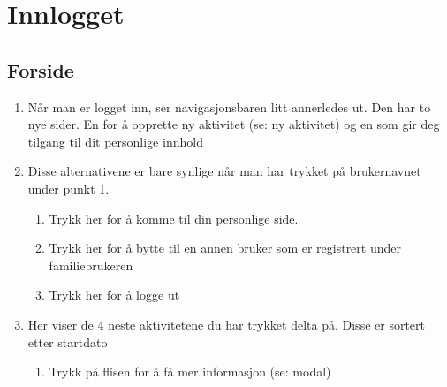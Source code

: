 
\section{Innlogget}

\subsection{Forside}
\begin{center}
\end{center}
\begin{enumerate}[nosep]
    \item Når man er logget inn, ser navigasjonsbaren litt annerledes ut. Den har to nye sider. En for å opprette ny aktivitet (se: ny aktivitet) og en som gir deg tilgang til dit personlige innhold
    \item Disse alternativene er bare synlige når man har trykket på brukernavnet under punkt 1.
    \begin{enumerate}
        \item Trykk her for å komme til din personlige side.
        \item Trykk her for å bytte til en annen bruker som er registrert under familiebrukeren
        \item Trykk her for å logge ut
    \end{enumerate}
    \item Her viser de 4 neste aktivitetene du har trykket delta på. Disse er sortert etter startdato
    \begin{enumerate}
        \item Trykk på flisen for å få mer informasjon (se: modal)
    \end{enumerate}
\end{enumerate}

